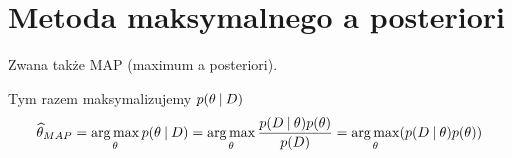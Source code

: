 \section{Metoda maksymalnego a posteriori}

Zwana także MAP (maximum a posteriori).

Tym razem maksymalizujemy \( p(\theta \:\vert\: D) \)
\[
    \map{\theta} 
        = \argmax_\theta p(\theta \given D) 
        = \argmax_\theta \frac{p(D \given \theta)p(\theta)}{p(D)}
        = \argmax_\theta \pars{p(D \given \theta)p(\theta)}
\]